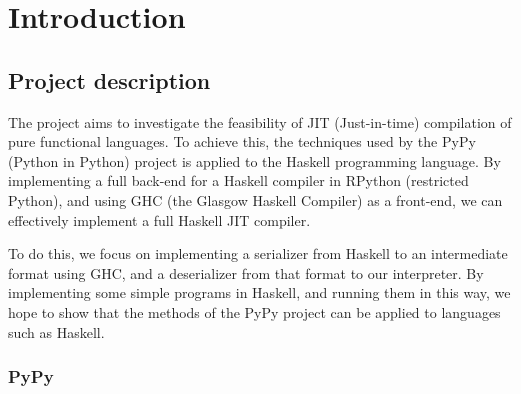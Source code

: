
\chapter{Introduction}

\section{Project description}

The project aims to investigate the feasibility of JIT (Just-in-time) 
compilation of pure functional languages. To achieve this, the techniques used by the 
PyPy (Python in Python) project is applied to the Haskell programming 
language. By implementing a full back-end for a Haskell compiler in RPython 
(restricted Python), and using GHC (the Glasgow Haskell Compiler) as a 
front-end, we can effectively implement a full Haskell JIT compiler.

To do this, we focus on implementing a serializer from Haskell to an intermediate
format using GHC, and a deserializer from that format to our interpreter. By implementing
some simple programs in Haskell, and running them in this way, we hope to show that the
methods of the PyPy project can be applied to languages such as Haskell.

\subsection{PyPy}

\begin{comment}
PyPy has defined a proper subset of Python called RPython. RPython is defined
such that it is possible to perform type inference on it.

The PyPy (Python in Python) project is successfull at boosting the speed 
of the Python programming language through the use of a Just-In-Time compiler. 
To do this, PyPy utilizes an environment where the implementation of dynamic languages
can be done in a simple but efficient way.
 
The PyPy project contains a tracing JIT for 
RPython (a restricted proper subset of Python.) The RPython program is translated 
into a C program containing a JIT compiler. 

A tracing JIT compiler works by tracing the execution of the program, and then feeding
this information back in order to exploit it for increased performance. The PyPy 
project manages to trace the meta-level; by tracing the interpreter written in RPython,
the program being interpreted are also, in effect being traced.
\end{comment}


